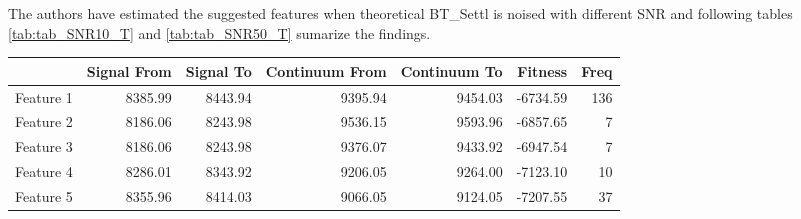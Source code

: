 The authors have estimated the suggested features when theoretical BT\_Settl 
is noised with different SNR and following tables \ref{tab:tab_SNR10_T} 
and \ref{tab:tab_SNR50_T} sumarize the findings.


\begin{table}
\begin{center}
\begin{tabular}{rrrrrrr}
  \hline
 & Signal From & Signal To & Continuum From & Continuum To & Fitness & Freq \\ 
  \hline
Feature 1 & 8385.99 & 8443.94 & 9395.94 & 9454.03 & -6734.59 & 136 \\ 
  Feature 2 & 8186.06 & 8243.98 & 9536.15 & 9593.96 & -6857.65 &   7 \\ 
  Feature 3 & 8186.06 & 8243.98 & 9376.07 & 9433.92 & -6947.54 &   7 \\ 
  Feature 4 & 8286.01 & 8343.92 & 9206.05 & 9264.00 & -7123.10 &  10 \\ 
  Feature 5 & 8355.96 & 8414.03 & 9066.05 & 9124.05 & -7207.55 &  37 \\ 

\end{tabular}
\end{center}
\end{table}
